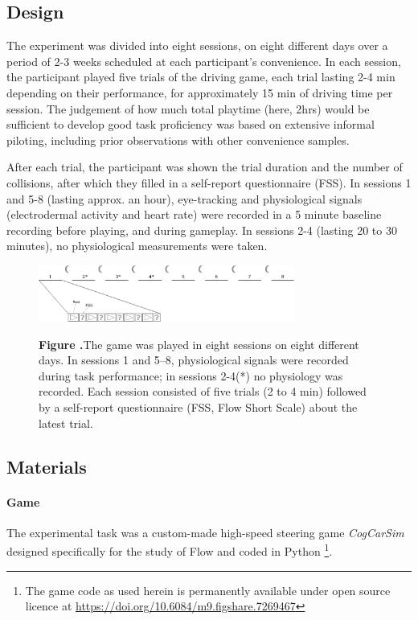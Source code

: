 \documentclass{frontierstyle/frontiersSCNS}
\newcommand{\nicewidth}{0.75\textwidth}
\newcommand{\tapprx}{\raisebox{0.4ex}{\texttildelow}}
\begin{document}
\subsection{Design}
The experiment was divided into eight sessions, on eight different days over a period of 2-3 weeks scheduled at each participant's convenience. In each session, the participant played five trials of the driving game, each trial lasting 2-4 min depending on their performance, for approximately 15 min of driving time per session. The judgement of how much total playtime (here, \tapprx2hrs) would be sufficient to develop good task proficiency was based on extensive informal piloting, including prior observations with other convenience samples.

After each trial, the participant was shown the trial duration and the number of collisions, after which they filled in a self-report questionnaire (FSS). In sessions 1 and 5-8 (lasting approx. an hour), eye-tracking and physiological signals (electrodermal activity and heart rate) were recorded in a 5 minute baseline recording before playing, and during gameplay. In sessions 2-4 (lasting 20 to 30 minutes), no physiological measurements were taken.

\begin{figure}[!ht]
\begin{center}
  \includegraphics[width=\nicewidth]{2_design}
\end{center}
  \textbf{\label{fig:design} Figure .}{The game was played in eight sessions on eight different days. In sessions 1 and 5--8, physiological signals were recorded during task performance; in sessions 2-4(*) no physiology was recorded. Each session consisted of five trials (2 to 4 min) followed by a self-report questionnaire (FSS, Flow Short Scale) about the latest trial.}
\end{figure}

\subsection{Materials}
\paragraph*{Game} The experimental task was a custom-made high-speed steering game {\it CogCarSim} designed specifically for the study of Flow and coded in Python \footnote{The game code as used herein is permanently available under open source licence at \url{https://doi.org/10.6084/m9.figshare.7269467}}.
\end{document}
